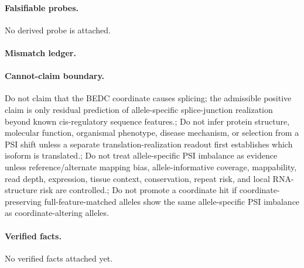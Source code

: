\paragraph{Falsifiable probes.}
No derived probe is attached.

\paragraph{Mismatch ledger.}
\paragraph{Cannot-claim boundary.} Do not claim that the BEDC coordinate causes splicing; the admissible positive claim is only residual prediction of allele-specific splice-junction realization beyond known cis-regulatory sequence features.; Do not infer protein structure, molecular function, organismal phenotype, disease mechanism, or selection from a PSI shift unless a separate translation-realization readout first establishes which isoform is translated.; Do not treat allele-specific PSI imbalance as evidence unless reference/alternate mapping bias, allele-informative coverage, mappability, read depth, expression, tissue context, conservation, repeat risk, and local RNA-structure risk are controlled.; Do not promote a coordinate hit if coordinate-preserving full-feature-matched alleles show the same allele-specific PSI imbalance as coordinate-altering alleles.

\paragraph{Verified facts.}
No verified facts attached yet.
